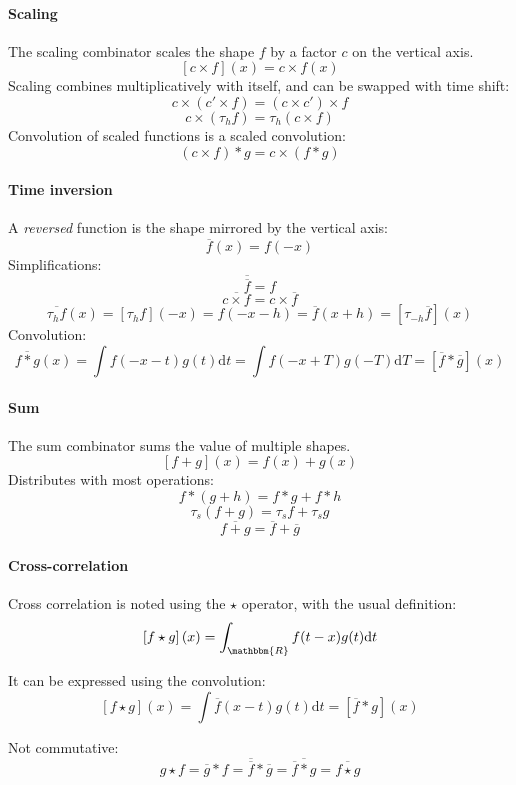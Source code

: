 \documentclass[a4paper,10pt]{article}
\newcommand\D{\mathrm{d}}
\newcommand\R{\mathbbm{R}}
\newcommand\Convolution{\ast}
\newcommand\Correlation{\star}
\newcommand\Reversed[1]{\overline{#1}}
\begin{document}
\paragraph{Scaling}
The scaling combinator scales the shape $f$ by a factor $c$ on the vertical axis.
\[ \left[ c \times f \right] (x) = c \times f(x) \]
Scaling combines multiplicatively with itself, and can be swapped with time shift:
\[ c \times (c' \times f) =  (c \times c') \times f \]
\[ c \times (\tau_h f) = \tau_h (c \times f) \]
Convolution of scaled functions is a scaled convolution:
\[ (c \times f) \Convolution g = c \times (f \Convolution g) \]

\paragraph{Time inversion}
A \emph{reversed} function is the shape mirrored by the vertical axis:
\[ \Reversed{f}(x) = f(-x) \]
Simplifications:
\[ \Reversed{\Reversed{f}} = f \]
\[ \Reversed{c \times f} = c \times \Reversed{f} \]
\[ \Reversed{\tau_h f}(x) = [\tau_h f](-x) = f(-x-h) = \Reversed{f}(x+h) = [\tau_{-h} \Reversed{f}] (x) \]
Convolution:
\[
    \Reversed{f \Convolution g}(x) = \int f(-x-t) g(t) \D t = \int f(-x+T) g(-T) \D T = \left[ \Reversed{f} \Convolution \Reversed{g} \right] (x)
\]

\paragraph{Sum}
The sum combinator sums the value of multiple shapes.
\[ [f+g](x) = f(x) + g(x) \]
Distributes with most operations:
\[ f \Convolution (g + h) = f \Convolution g + f \Convolution h \]
\[ \tau_s (f + g) = \tau_s f + \tau_s g \]
\[ \Reversed{f + g} = \Reversed{f} + \Reversed{g} \]

\paragraph{Cross-correlation}
Cross correlation is noted using the $\Correlation$ operator, with the usual definition:
\[ \left[ f \Correlation g \right] (x) = \int_\R f(t-x) g(t) \D t \]

It can be expressed using the convolution:
\[ \left[ f \Correlation g \right] (x) = \int \Reversed{f}(x-t) g(t) \D t = \left[ \Reversed{f} \Convolution g \right] (x) \]

Not commutative:
\[
    g \Correlation f = \Reversed{g} \Convolution f = \Reversed{\Reversed{f}} \Convolution \Reversed{g} =
    \Reversed{\Reversed{f} \Convolution g} = \Reversed{f \Correlation g}
\]
\end{document}
